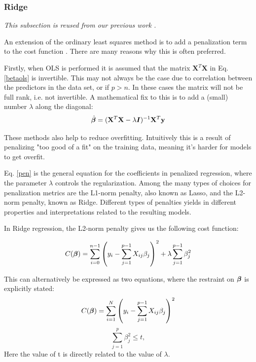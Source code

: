 \subsubsection{Ridge}
\textit{This subsection is reused from our previous work \citep[p. 4-5]{project1}.}

An extension of the ordinary least squares method is to add a penalization term to the cost function \citep[p.61-68]{hastie}. There are many reasons why this is often preferred. 

Firstly, when OLS is performed it is assumed that the matrix $\boldsymbol{X}^T\boldsymbol{X}$ in Eq. \ref{betaols} is invertible. This may not always be the case due to correlation between the predictors in the data set, or if $p > n$. In these cases the matrix will not be full rank, i.e. not invertible. 
A mathematical fix to this is to add a (small) number $\lambda$ along the diagonal: 
\begin{equation}\label{pen}
    \hat{\boldsymbol{\beta}} = (\mathbf{X}^T\mathbf{X}- \lambda\boldsymbol{I})^{-1}\mathbf{X}^T\mathbf{y}
\end{equation}

These methods also help to reduce overfitting. Intuitively this is a result of penalizing "too good of a fit" on the training data, meaning it's harder for models to get overfit. 

Eq. \ref{pen} is the general equation for the coefficients in penalized regression, where the parameter $\lambda$ controls the regularization. Among the many types of choices for penalization metrics are the L1-norm penalty, also known as Lasso, and the L2-norm penalty, known as Ridge. Different types of penalties yields in different properties and interpretations related to the resulting models.

In Ridge regression, the L2-norm penalty gives us the following cost function:

\begin{equation}\label{ridge}
     C(\boldsymbol{\beta}) = \sum_{i=0}^{n-1} \left( y_i - \sum_{j=1}^{p-1} X_{ij}\beta_j \right)^2 + \lambda\sum_{j=1}^{p-1} \beta_j^2 
\end{equation}




This can alternatively be expressed as two equations, where the restraint on $\boldsymbol{\beta}$ is explicitly stated:
\begin{equation}\label{ridge_alt}
    C(\boldsymbol{\beta}) = \sum_{i=1}^N \left(y_i - \sum_{j=1}^{p-1} X_{ij}\beta_j \right)^2
\end{equation}
\begin{equation}\label{ridge_constraint}
    \sum_{j=1}^p \beta_j^2 \leq t, 
\end{equation}
Here the value of t is directly related to the value of $\lambda$.

